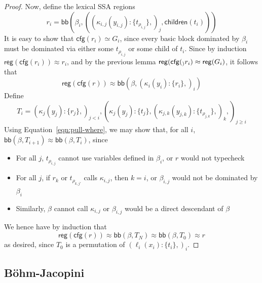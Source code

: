 \documentclass[acmsmall,screen,review]{acmart}
\newcommand{\ms}[1]{\ensuremath{\mathsf{#1}}}
\newcommand{\lto}{:}
\newcommand{\wbranch}[3]{#1(#2) \lto \{#3\}}
\newcommand{\teqv}{\approx}
\newcommand{\todom}[1]{\ms{children}(#1)}
\newcommand{\tocfg}[1]{\ms{cfg}(#1)}
\newcommand{\adddom}[2]{\ms{bb}(#1, #2)}
\newcommand{\toreg}[1]{\ms{reg}(#1)}
\begin{document}
\begin{proof}
  Now, define the lexical SSA regions
  \begin{equation}
    r_i = \adddom{\beta_i}{
      ((\wbranch{\kappa_{i, j}}{y_{i, j}}{t_{\rho_{i, j}}},)_j, \todom{t_i})
    }
  \end{equation}
  It is easy to show that $\tocfg{r_i} \simeq G_i$, since every basic block dominated by $\beta_i$
  must be dominated via either some $t_{\rho_{i, j}}$ or some child of $t_i$. Since by induction
  $\toreg{\tocfg{r_i}} \teqv r_i$, and by the previous lemma $\toreg{\tocfg_r_i} \teqv \toreg{G_i}$,
  it follows that
  \begin{equation}
    \toreg{\tocfg{r}}
    \teqv \adddom{\beta}{(\wbranch{\kappa_i}{y_i}{r_i},)_i}
  \end{equation}
  Define
  \begin{equation}
    T_i = (\wbranch{\kappa_j}{y_j}{r_j},)_{j < i}, 
      (\wbranch{\kappa_j}{y_j}{t_j}, 
      (\wbranch{\kappa_{j, k}}{y_{j, k}}{t_{\rho_{j, k}}},)_k,)_{j \geq i}
  \end{equation}
  Using Equation~\ref{eqn:pull-where}, we may show that, for all $i$, $\adddom{\beta}{T_{i + 1}}
  \teqv \adddom{\beta}{T_i}$, since
  \begin{itemize}
    \item For all $j$, $t_{\rho_{i, j}}$ cannot use variables defined in $\beta_i$, or $r$ would not
    typecheck
    \item For all $j$, if $r_k$ or $t_{\rho_{k, j'}}$ calls $\kappa_{i, j}$, then $k = i$, or
    $\beta_{i, j}$ would not be dominated by $\beta_i$
    \item Similarly, $\beta$ cannot call $\kappa_{i, j}$ or $\beta_{i, j}$ would be a direct
    descendant of $\beta$
  \end{itemize}
  We hence have by induction that
  \begin{equation}
    \toreg{\tocfg{r}} \teqv \adddom{\beta}{T_N} \teqv \adddom{\beta}{T_0} \teqv r
  \end{equation}
  as desired, since $T_0$ is a permutation of $(\wbranch{\ell_i}{x_i}{t_i},)_i$.
\end{proof}

\subsection{B\"ohm-Jacopini}
\end{document}
